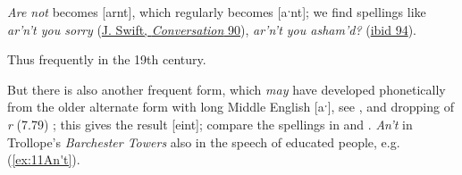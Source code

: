 \bigskip
\textit{Are not} becomes [arnt], which regularly becomes [aˑnt]; we find spellings like \textit{ar'n't you sorry} (\href{https://archive.org/details/cu31924013200898/page/n125/mode/2up?q=%22ar%27n%27t+you%22&view=theater}{J. Swift, \textit{Conversation} 90}), \textit{ar'n't you asham'd?} (\href{https://archive.org/details/cu31924013200898/page/n129/mode/2up?q=%22ar%27n%27t+you%22&view=theater}{ibid 94}).

Thus frequently in the 19th century.

\label{ch11-aint}But there is also another frequent form, which \textit{may} have developed phonetically from the older alternate form with long Middle English [aˑ],
see \citet[4.432]{jespersenMEG1}, %
and dropping of \textit{r} (7.79)%
; this gives the result [eint]; compare the spellings in  and . 
\textit{An't} in Trollope's \textit{Barchester Towers} also in the speech of educated people, e.g. (\ref{ex:11An't}). %


